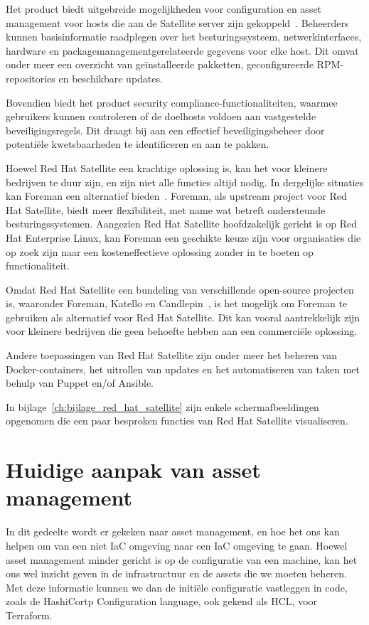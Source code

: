 Het product biedt uitgebreide mogelijkheden voor configuration en asset management voor hosts die aan de Satellite server zijn gekoppeld~\autocite{rhel-satellite-hosts}.
Beheerders kunnen basisinformatie raadplegen over het besturingssysteem, netwerkinterfaces, hardware en packagemanagementgerelateerde gegevens voor elke host.
Dit omvat onder meer een overzicht van ge\"installeerde pakketten, geconfigureerde RPM-repositories en beschikbare updates.

Bovendien biedt het product security compliance-functionaliteiten, waarmee gebruikers kunnen controleren of de doelhosts voldoen aan vastgestelde beveiligingsregels.
Dit draagt bij aan een effectief beveiligingsbeheer door potenti\"ele kwetsbaarheden te identificeren en aan te pakken.

Hoewel Red Hat Satellite een krachtige oplossing is, kan het voor kleinere bedrijven te duur zijn, en zijn niet alle functies altijd nodig.
In dergelijke situaties kan Foreman een alternatief bieden~\autocite{foreman-introduction}.
Foreman, als upstream project voor Red Hat Satellite, biedt meer flexibiliteit, met name wat betreft ondersteunde besturingssystemen.
Aangezien Red Hat Satellite hoofdzakelijk gericht is op Red Hat Enterprise Linux, kan Foreman een geschikte keuze zijn voor organisaties die op zoek zijn naar een kosteneffectieve oplossing zonder in te boeten op functionaliteit.

Omdat Red Hat Satellite een bundeling van verschillende open-source projecten is, waaronder Foreman, Katello en Candlepin~\autocite{rhel-satellite-6-introduction}, is het mogelijk om Foreman te gebruiken als alternatief voor Red Hat Satellite.
Dit kan vooral aantrekkelijk zijn voor kleinere bedrijven die geen behoefte hebben aan een commerci\"ele oplossing.

Andere toepassingen van Red Hat Satellite zijn onder meer het beheren van Docker-containers, het uitrollen van updates en het automatiseren van taken met behulp van Puppet en/of Ansible.

In bijlage~\ref{ch:bijlage_red_hat_satellite} zijn enkele schermafbeeldingen opgenomen die een paar besproken functies van Red Hat Satellite visualiseren.

\section{Huidige aanpak van asset management}%
\label{sec:huidige-aanpak-van-asset-management}

In dit gedeelte wordt er gekeken naar asset management, en hoe het ons kan helpen om van een niet IaC omgeving naar een IaC omgeving te gaan.
Hoewel asset management minder gericht is op de configuratie van een machine, kan het ons wel inzicht geven in de infrastructuur en de assets die we moeten beheren.
Met deze informatie kunnen we dan de initi\"ele configuratie vastleggen in code, zoals de HashiCortp Configuration language, ook gekend als HCL, voor Terraform.

